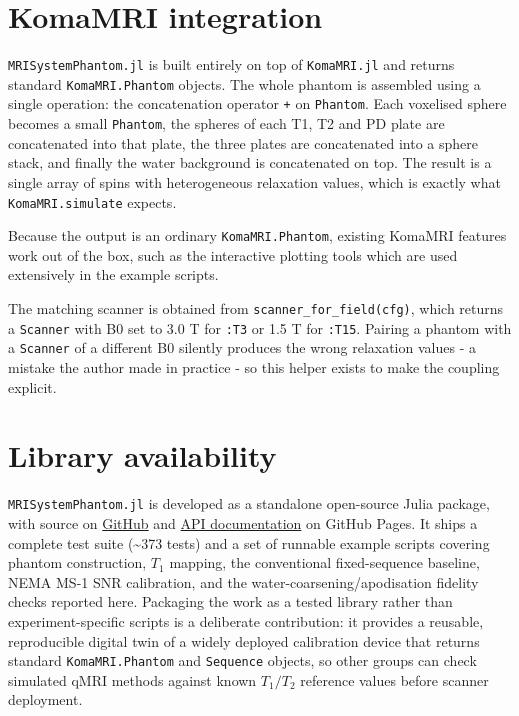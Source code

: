 \hypertarget{komamri-integration}{%
\section{KomaMRI integration}\label{komamri-integration}}

\texttt{MRISystemPhantom.jl} is built entirely on top of
\texttt{KomaMRI.jl} and returns standard \texttt{KomaMRI.\allowbreak Phantom}
objects. The whole phantom is assembled using a single operation: the
concatenation operator \texttt{+} on \texttt{Phantom}. Each voxelised
sphere becomes a small \texttt{Phantom}, the spheres of each T1, T2 and
PD plate are concatenated into that plate, the three plates are
concatenated into a sphere stack, and finally the water background is
concatenated on top. The result is a single array of spins with
heterogeneous relaxation values, which is exactly what
\texttt{KomaMRI.\allowbreak simulate} expects.

Because the output is an ordinary \texttt{KomaMRI.\allowbreak Phantom}, existing
KomaMRI features work out of the box, such as the interactive plotting
tools which are used extensively in the example scripts.

The matching scanner is obtained from \texttt{scanner\_\allowbreak for\_\allowbreak field(cfg)},
which returns a \texttt{Scanner} with B0 set to 3.0 T for \texttt{:T3}
or 1.5 T for \texttt{:T15}. Pairing a phantom with a \texttt{Scanner} of
a different B0 silently produces the wrong relaxation values - a mistake
the author made in practice - so this helper exists to make the coupling
explicit.

\hypertarget{library-availability}{%
\section{Library availability}\label{library-availability}}

\texttt{MRISystemPhantom.jl} is developed as a standalone open-source
Julia package, with source on
\href{https://github.com/ArthurAllilaire/MRISystemPhantom.jl}{GitHub} and
\href{https://arthurallilaire.github.io/MRISystemPhantom.jl}{API
documentation} on GitHub Pages. It ships a complete test suite
(\textasciitilde373 tests) and a set of runnable example scripts covering
phantom construction, $T_1$ mapping, the conventional fixed-sequence
baseline, NEMA MS-1 SNR calibration, and the water-coarsening/apodisation
fidelity checks reported here. Packaging the work as a tested library rather
than experiment-specific scripts is a deliberate contribution: it provides a
reusable, reproducible digital twin of a widely deployed calibration device
that returns standard \texttt{KomaMRI.Phantom} and \texttt{Sequence}
objects, so other groups can check simulated qMRI methods against known
$T_1/T_2$ reference values before scanner deployment.

